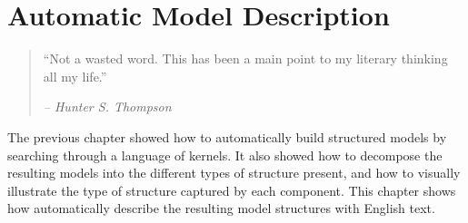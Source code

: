 
\inbpdocument


\chapter{Automatic Model Description}
\label{ch:description}












\begin{quotation}
``Not a wasted word.
This has been a main point to my literary thinking all my life.''

\hspace*{\fill} \emph{ -- Hunter S. Thompson}
\end{quotation}



The previous chapter showed how to automatically build structured models by searching through a language of kernels.
It also showed how to decompose the resulting models into the different types of structure present, and how to visually illustrate the type of structure captured by each component.
This chapter shows how automatically describe the resulting model structures with English text.

